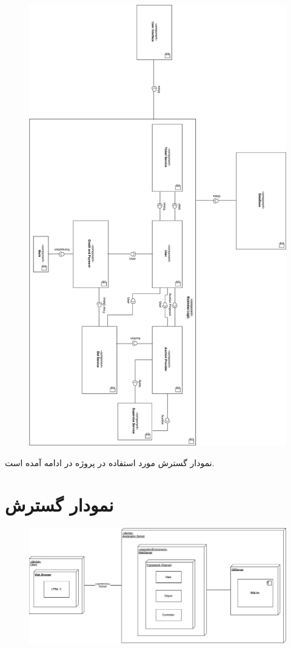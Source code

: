 \documentclass{article}
\begin{document}
\begin{figure}[htp]
\includegraphics[width = 1\textwidth]{../Component Diagram/Component Diagram.jpg}
\caption{}
\label{compo}
\end{figure}

\newpage

نمودار گسترش مورد استفاده در پروژه در ادامه آمده است.

\section{نمودار گسترش}

\begin{figure}[htp]
\includegraphics[width = 1\textwidth]{../Deployment Diagram/Deployment Diagram.jpg}
\caption{}
\label{deplo}
\end{figure}
\end{document}
